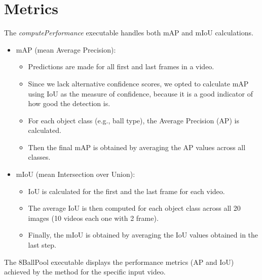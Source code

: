 \section{Metrics}
The \textit{computePerformance} executable handles both mAP and mIoU calculations.
\begin{itemize}
    \item mAP (mean Average Precision):
        \begin{itemize}
            \item Predictions are made for all first and last frames in a video.
            \item Since we lack alternative confidence scores, we opted to calculate mAP using IoU as the measure of confidence, because it is a good indicator of how good the detection is.
            \item For each object class (e.g., ball type), the Average Precision (AP) is calculated.
            \item Then the final mAP is obtained by averaging the AP values across all classes.
        \end{itemize}
\end{itemize}
\begin{itemize}
    \item mIoU (mean Intersection over Union):
        \begin{itemize}
            \item IoU is calculated for the first and the last frame for each video.
            \item The average IoU is then computed for each object class across all 20 images (10 videos each one with 2 frame).
            \item Finally, the mIoU is obtained by averaging the IoU values obtained in the last step.
        \end{itemize}
\end{itemize}
The 8BallPool executable displays the performance metrics (AP and IoU) achieved by the method for the specific input video.